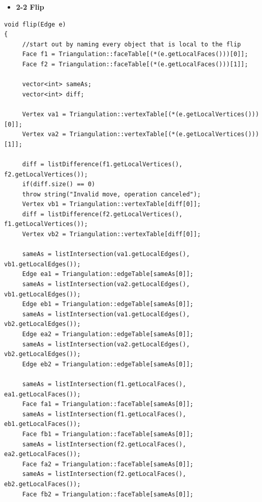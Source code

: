 \documentclass[12pt]{article}
\begin{document}
\begin{itemize}
\item \textbf{2-2 Flip}
\end{itemize}
\begin{verbatim}
void flip(Edge e)
{
     //start out by naming every object that is local to the flip
     Face f1 = Triangulation::faceTable[(*(e.getLocalFaces()))[0]];
     Face f2 = Triangulation::faceTable[(*(e.getLocalFaces()))[1]];
     
     vector<int> sameAs;
     vector<int> diff;
     
     Vertex va1 = Triangulation::vertexTable[(*(e.getLocalVertices()))[0]];
     Vertex va2 = Triangulation::vertexTable[(*(e.getLocalVertices()))[1]];
          
     diff = listDifference(f1.getLocalVertices(), f2.getLocalVertices());
     if(diff.size() == 0)
     throw string("Invalid move, operation canceled");
     Vertex vb1 = Triangulation::vertexTable[diff[0]];
     diff = listDifference(f2.getLocalVertices(), f1.getLocalVertices());
     Vertex vb2 = Triangulation::vertexTable[diff[0]];
     
     sameAs = listIntersection(va1.getLocalEdges(), vb1.getLocalEdges());
     Edge ea1 = Triangulation::edgeTable[sameAs[0]];
     sameAs = listIntersection(va2.getLocalEdges(), vb1.getLocalEdges());
     Edge eb1 = Triangulation::edgeTable[sameAs[0]];
     sameAs = listIntersection(va1.getLocalEdges(), vb2.getLocalEdges());
     Edge ea2 = Triangulation::edgeTable[sameAs[0]];
     sameAs = listIntersection(va2.getLocalEdges(), vb2.getLocalEdges());
     Edge eb2 = Triangulation::edgeTable[sameAs[0]];
     
     sameAs = listIntersection(f1.getLocalFaces(), ea1.getLocalFaces());
     Face fa1 = Triangulation::faceTable[sameAs[0]];
     sameAs = listIntersection(f1.getLocalFaces(), eb1.getLocalFaces());
     Face fb1 = Triangulation::faceTable[sameAs[0]];
     sameAs = listIntersection(f2.getLocalFaces(), ea2.getLocalFaces());
     Face fa2 = Triangulation::faceTable[sameAs[0]];
     sameAs = listIntersection(f2.getLocalFaces(), eb2.getLocalFaces());
     Face fb2 = Triangulation::faceTable[sameAs[0]];
     

\end{verbatim}
\end{document}
